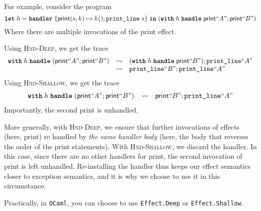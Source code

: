 For example, consider the program
\[\textbf{\texttt{let}} \; h = \textbf{\texttt{handler}} \; \{ \textsf{print}(s, k) \mapsto k(); \texttt{print\_line} \; s \} \; \textbf{\texttt{in}} \; (\textbf{\texttt{with}} \; h \; \textbf{\texttt{handle}} \;\textsf{print} ``A"; \textsf{print} ``B") \]
Where there are multiple invocations of the \textsf{print} effect.

Using \textsc{Hnd-Deep}, we get the trace
\[\begin{array}{lll}
    \textbf{\texttt{with}} \; h \; \textbf{\texttt{handle}} \; (\textsf{print} ``A"; \textsf{print} ``B") & \leadsto &  (\textbf{\texttt{with}} \; h \; \textbf{\texttt{handle}} \; \textsf{print} ``B"); \texttt{print\_line} ``A"\\
    & \leadsto &  \texttt{print\_line} ``B"; \texttt{print\_line} ``A"
\end{array}\]
Using \textsc{Hnd-Shallow}, we get the trace
\[\begin{array}{lll}
    \textbf{\texttt{with}} \; h \; \textbf{\texttt{handle}} \; (\textsf{print} ``A"; \textsf{print} ``B") & \leadsto &   \textsf{print} ``B"; \texttt{print\_line} ``A"\\
\end{array}\]
Importantly, the second print is unhandled. 

More generally, with \textsc{Hnd-Deep}, we ensure that further invocations of effects (here, \textsf{print}) re handled by \textit{the same handler body} (here, the body that reverses the order of the print statements). With \textsc{Hnd-Shallow}, we discard the handler. In this case, since there are no other handlers for \textsf{print}, the second invocation of \textsf{print} is left unhandled. Re-installing the handler thus keeps our effect semantics closer to exception semantics, and it is why we choose to use it in this circumstance.

Practically, in \texttt{OCaml}, you can choose to use \texttt{Effect.Deep} or \texttt{Effect.Shallow}.

